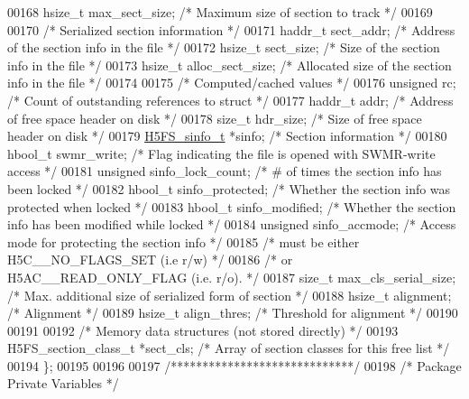 \begin{DoxyCode}
00168     hsize\_t max\_sect\_size;      \textcolor{comment}{/* Maximum size of section to track */}
00169 
00170     \textcolor{comment}{/* Serialized section information */}
00171     haddr\_t sect\_addr;          \textcolor{comment}{/* Address of the section info in the file    */}
00172     hsize\_t sect\_size;          \textcolor{comment}{/* Size of the section info in the file       */}
00173     hsize\_t alloc\_sect\_size;    \textcolor{comment}{/* Allocated size of the section info in the file */}
00174 
00175 \textcolor{comment}{/* Computed/cached values */}
00176     \textcolor{keywordtype}{unsigned} rc;                \textcolor{comment}{/* Count of outstanding references to struct  */}
00177     haddr\_t addr;               \textcolor{comment}{/* Address of free space header on disk       */}
00178     \textcolor{keywordtype}{size\_t} hdr\_size;            \textcolor{comment}{/* Size of free space header on disk          */}
00179     \hyperlink{struct_h5_f_s__sinfo__t}{H5FS\_sinfo\_t} *sinfo;        \textcolor{comment}{/* Section information                        */}
00180     hbool\_t swmr\_write;         \textcolor{comment}{/* Flag indicating the file is opened with SWMR-write access */}
00181     \textcolor{keywordtype}{unsigned} sinfo\_lock\_count;  \textcolor{comment}{/* # of times the section info has been locked */}
00182     hbool\_t sinfo\_protected;    \textcolor{comment}{/* Whether the section info was protected when locked */}
00183     hbool\_t sinfo\_modified;     \textcolor{comment}{/* Whether the section info has been modified while locked */}
00184     \textcolor{keywordtype}{unsigned} sinfo\_accmode;     \textcolor{comment}{/* Access mode for protecting the section info */}
00185                                 \textcolor{comment}{/* must be either H5C\_\_NO\_FLAGS\_SET (i.e r/w)  */}
00186                 \textcolor{comment}{/* or H5AC\_\_READ\_ONLY\_FLAG (i.e. r/o).         */}
00187     \textcolor{keywordtype}{size\_t} max\_cls\_serial\_size; \textcolor{comment}{/* Max. additional size of serialized form of section */}
00188     hsize\_t    alignment;       \textcolor{comment}{/* Alignment                            */}
00189     hsize\_t    align\_thres;     \textcolor{comment}{/* Threshold for alignment              */}
00190 
00191 
00192 \textcolor{comment}{/* Memory data structures (not stored directly) */}
00193     H5FS\_section\_class\_t *sect\_cls; \textcolor{comment}{/* Array of section classes for this free list */}
00194 \};
00195 
00196 
00197 \textcolor{comment}{/*****************************/}
00198 \textcolor{comment}{/* Package Private Variables */}

\end{DoxyCode}
